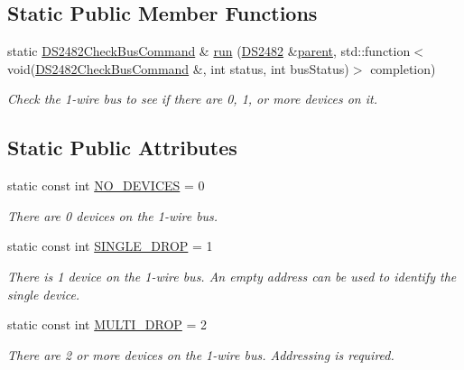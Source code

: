 \subsection*{Static Public Member Functions}
\begin{DoxyCompactItemize}
\item 
static \mbox{\hyperlink{class_d_s2482_check_bus_command}{D\+S2482\+Check\+Bus\+Command}} \& \mbox{\hyperlink{class_d_s2482_check_bus_command_a6710655a1ac2abc35d08db156d215c75}{run}} (\mbox{\hyperlink{class_d_s2482}{D\+S2482}} \&\mbox{\hyperlink{class_d_s2482_command_a54a41fb8a610ef2077f5e5377771aaf3}{parent}}, std\+::function$<$ void(\mbox{\hyperlink{class_d_s2482_check_bus_command}{D\+S2482\+Check\+Bus\+Command}} \&, int status, int bus\+Status)$>$ completion)
\begin{DoxyCompactList}\small\item\em Check the 1-\/wire bus to see if there are 0, 1, or more devices on it. \end{DoxyCompactList}\end{DoxyCompactItemize}
\subsection*{Static Public Attributes}
\begin{DoxyCompactItemize}
\item 
\mbox{\label{class_d_s2482_check_bus_command_a926bd84843d75b022d88c896fd4608c1}} 
static const int \mbox{\hyperlink{class_d_s2482_check_bus_command_a926bd84843d75b022d88c896fd4608c1}{N\+O\+\_\+\+D\+E\+V\+I\+C\+ES}} = 0
\begin{DoxyCompactList}\small\item\em There are 0 devices on the 1-\/wire bus. \end{DoxyCompactList}\item 
\mbox{\label{class_d_s2482_check_bus_command_acf9addb2b671bfc9567dd58228379ec5}} 
static const int \mbox{\hyperlink{class_d_s2482_check_bus_command_acf9addb2b671bfc9567dd58228379ec5}{S\+I\+N\+G\+L\+E\+\_\+\+D\+R\+OP}} = 1
\begin{DoxyCompactList}\small\item\em There is 1 device on the 1-\/wire bus. An empty address can be used to identify the single device. \end{DoxyCompactList}\item 
\mbox{\label{class_d_s2482_check_bus_command_af268c37a135b78ae684adfebeee349c1}} 
static const int \mbox{\hyperlink{class_d_s2482_check_bus_command_af268c37a135b78ae684adfebeee349c1}{M\+U\+L\+T\+I\+\_\+\+D\+R\+OP}} = 2
\begin{DoxyCompactList}\small\item\em There are 2 or more devices on the 1-\/wire bus. Addressing is required. \end{DoxyCompactList}\end{DoxyCompactItemize}
